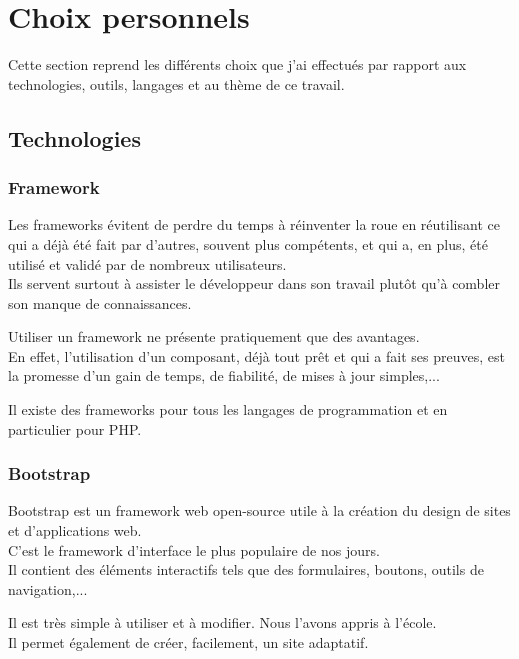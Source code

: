 \section{Choix personnels}
\label{sec:personnal-choices}
Cette section reprend les différents choix que j'ai effectués par rapport aux technologies, outils, langages et au thème de ce travail.

\subsection{Technologies}
\label{subsec:tech}

\subsubsection{Framework}
\label{sec:framework}
Les frameworks évitent de perdre du temps à réinventer la roue en 
réutilisant ce qui a déjà été fait par d'autres, souvent plus compétents, et qui a, en plus, été utilisé et validé par de nombreux utilisateurs.\\
Ils servent surtout à assister le développeur dans son travail plutôt qu'à combler son manque de connaissances.

Utiliser un framework ne présente pratiquement que des avantages.\\
En effet, l'utilisation d'un composant, déjà tout prêt et qui a fait ses preuves, est la promesse d'un gain de temps, de fiabilité, de mises à jour simples,...

Il existe des frameworks pour tous les langages de programmation et en particulier pour PHP.

\subsubsection{Bootstrap}
\label{sec:bootstrap}
Bootstrap est un framework web open-source utile à la création du design de sites et d'applications web.\\
C'est le framework d'interface le plus populaire de nos jours.\\
Il contient des éléments interactifs tels que des formulaires, boutons, outils de navigation,...

Il est très simple à utiliser et à modifier. Nous l'avons appris à l'école. \\
Il permet également de créer, facilement, un site adaptatif. 

\vspace{0.5cm}

